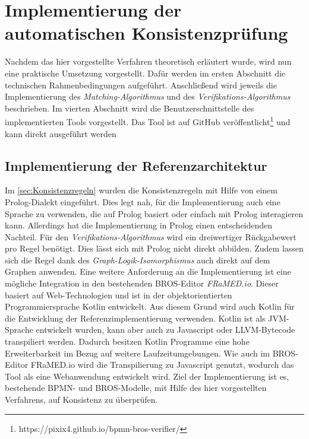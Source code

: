 \chapter{Implementierung der automatischen Konsistenzprüfung}
\label{chap:implementation}

Nachdem das hier vorgestellte Verfahren theoretisch erläutert wurde, wird nun eine praktische Umsetzung vorgestellt.
Dafür werden im ersten Abschnitt die technischen Rahmenbedingungen aufgeführt.
Anschließend wird jeweils die Implementierung des \emph{Matching-Algorithmus} und des \emph{Verifikations-Algorithmus} beschrieben.
Im vierten Abschnitt wird die Benutzerschnittstelle des implementierten Tools vorgestellt.
Das Tool ist auf GitHub veröffentlicht\footnote{https://pixix4.github.io/bpmn-bros-verifier/} und kann direkt ausgeführt werden

\section{Implementierung der Referenzarchitektur}

Im \cref{sec:Konsistenzregeln} wurden die Konsistenzregeln mit Hilfe von einem Prolog-Dialekt eingeführt.
Dies legt nah, für die Implementierung auch eine Sprache zu verwenden, die auf Prolog basiert oder einfach mit Prolog interagieren kann.
Allerdings hat die Implementierung in Prolog einen entscheidenden Nachteil.
Für den \emph{Verifikations-Algorithmus} wird ein dreiwertiger Rückgabewert pro Regel benötigt.
Dies lässt sich mit Prolog nicht direkt abbilden.
Zudem lassen sich die Regel dank des \emph{Graph-Logik-Isomorphismus} auch direkt auf dem Graphen anwenden.
Eine weitere Anforderung an die Implementierung ist eine mögliche Integration in den bestehenden BROS-Editor \emph{FRaMED.io}.
Dieser basiert auf Web-Technologien und ist in der objektorientierten Programmiersprache Kotlin entwickelt.
Aus diesem Grund wird auch Kotlin für die Entwicklung der Referenzimplementierung verwenden.
Kotlin ist als JVM-Sprache entwickelt wurden, kann aber auch zu Javascript oder LLVM-Bytecode transpiliert werden.
Dadurch besitzen Kotlin Programme eine hohe Erweiterbarkeit im Bezug auf weitere Laufzeitumgebungen.
Wie auch im BROS-Editor FRaMED.io wird die Transpilierung zu Javascript genutzt, wodurch das Tool als eine Webanwendung entwickelt wird.
Ziel der Implementierung ist es, bestehende BPMN- und BROS-Modelle, mit Hilfe des hier vorgestellten Verfahrens, auf Konsistenz zu überprüfen.

